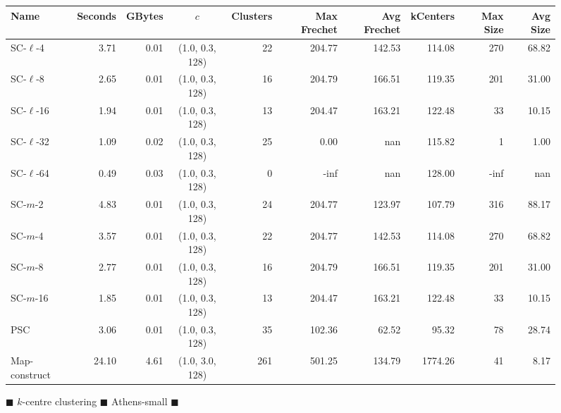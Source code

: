 \begin{figure}[h]
\begin{center}
\begin{minipage}{\textwidth}
    {
    \begin{tabular}{@{}lrrcrrrrrr@{}}
        \toprule
        Name & Seconds & GBytes & $c$ & Clusters & Max Frechet & Avg Frechet & kCenters & Max Size & Avg Size\\
        \midrule
        SC-$\ell$-4 & 3.71 & 0.01 & (1.0, 0.3, 128) & 22 & 204.77 & 142.53 & 114.08 & 270 & 68.82\\
        SC-$\ell$-8 & 2.65 & 0.01 & (1.0, 0.3, 128) & 16 & 204.79 & 166.51 & 119.35 & 201 & 31.00\\
        SC-$\ell$-16 & 1.94 & 0.01 & (1.0, 0.3, 128) & 13 & 204.47 & 163.21 & 122.48 & 33 & 10.15\\
        SC-$\ell$-32 & 1.09 & 0.02 & (1.0, 0.3, 128) & 25 & 0.00 & nan & 115.82 & 1 & 1.00\\
        SC-$\ell$-64 & 0.49 & 0.03 & (1.0, 0.3, 128) & 0 & -inf & nan & 128.00 & -inf & nan\\
        SC-$m$-2 & 4.83 & 0.01 & (1.0, 0.3, 128) & 24 & 204.77 & 123.97 & 107.79 & 316 & 88.17\\
        SC-$m$-4 & 3.57 & 0.01 & (1.0, 0.3, 128) & 22 & 204.77 & 142.53 & 114.08 & 270 & 68.82\\
        SC-$m$-8 & 2.77 & 0.01 & (1.0, 0.3, 128) & 16 & 204.79 & 166.51 & 119.35 & 201 & 31.00\\
        SC-$m$-16 & 1.85 & 0.01 & (1.0, 0.3, 128) & 13 & 204.47 & 163.21 & 122.48 & 33 & 10.15\\
        PSC & 3.06 & 0.01 & (1.0, 0.3, 128) & 35 & 102.36 & 62.52 & 95.32 & 78 & 28.74\\
        Map-construct & 24.10 & 4.61 & (1.0, 3.0, 128) & 261 & 501.25 & 134.79 & 1774.26 & 41 & 8.17\\
        \bottomrule
    \end{tabular}}
\end{minipage}
        \caption{$\blacksquare$ $k$-centre clustering $\blacksquare$ Athens-small  $\blacksquare$}
    \end{center} \end{figure}
